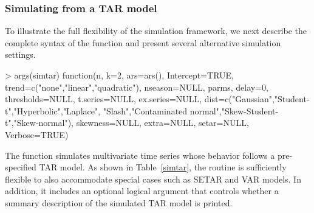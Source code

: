 \subsubsection{Simulating from a TAR model}

To illustrate the full flexibility of the simulation framework, we next describe the complete syntax of the  function and present several alternative simulation settings.
\begin{example}
> args(simtar)
function(n, k=2, ars=ars(), Intercept=TRUE, trend=c("none","linear","quadratic"), 
         nseason=NULL, parms, delay=0, thresholds=NULL, t.series=NULL, 
         ex.series=NULL, dist=c("Gaussian","Student-t","Hyperbolic","Laplace",
         "Slash","Contaminated normal","Skew-Student-t","Skew-normal"), 
         skewness=NULL, extra=NULL, setar=NULL, Verbose=TRUE)
\end{example}    
The function  simulates multivariate time series whose behavior follows a pre-specified TAR model. As shown in Table~\ref{simtar}, the routine is sufficiently flexible to also accommodate special cases such as SETAR and VAR models. In addition, it includes an optional logical argument that controls whether a summary description of the simulated TAR model is printed.

